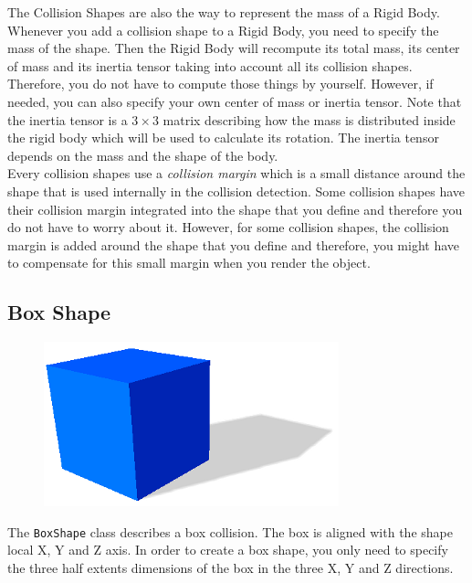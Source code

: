 \documentclass[a4paper,12pt]{article}
\begin{document}
    The Collision Shapes are also the way to represent the mass of a Rigid Body. Whenever you add a collision shape to a Rigid Body, you need to specify the mass of the shape.
    Then the Rigid Body will recompute its total mass, its center of mass and its inertia tensor taking into account all its collision shapes. Therefore, you do not have to compute
    those things by yourself. However, if needed, you can also specify your own center of mass or inertia tensor. Note that the inertia tensor is a $3 \times 3$ matrix describing
    how the mass is distributed inside the rigid body which will be used to calculate its rotation. The inertia tensor depends on the mass and the shape of the body. \\

    Every collision shapes use a \emph{collision margin} which is a small distance around the shape that is used internally in the collision detection.
    Some collision shapes have their collision margin integrated into the shape that you define and therefore you do not have to worry about it.
    However, for some collision shapes, the collision margin is added around the shape that you define and therefore, you might have to compensate
    for this small margin when you render the object. \\

    \subsection{Box Shape}

    \begin{figure}[h]
        \centering
        \includegraphics{boxshape.png}
        \label{fig:boxshape}
    \end{figure}

    The \texttt{BoxShape} class describes a box collision. The box is aligned with the shape local X, Y and Z axis.
    In order to create a box shape, you only need to specify the three half extents dimensions of the box in the three X, Y and Z directions. \\
\end{document}
